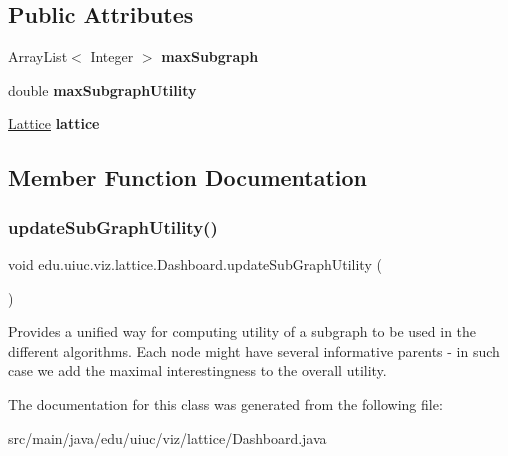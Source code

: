\subsection*{Public Attributes}
\begin{DoxyCompactItemize}
\item 
\mbox{\label{classedu_1_1uiuc_1_1viz_1_1lattice_1_1_dashboard_ad624354d237ebede6bde8751c5b37ff5}} 
Array\+List$<$ Integer $>$ {\bfseries max\+Subgraph}
\item 
\mbox{\label{classedu_1_1uiuc_1_1viz_1_1lattice_1_1_dashboard_a1078030e43f83e0e20bd6695dca9bc65}} 
double {\bfseries max\+Subgraph\+Utility}
\item 
\mbox{\label{classedu_1_1uiuc_1_1viz_1_1lattice_1_1_dashboard_a63a74fa170c8deda7b05ded929774567}} 
\mbox{\hyperlink{classedu_1_1uiuc_1_1viz_1_1lattice_1_1_lattice}{Lattice}} {\bfseries lattice}
\end{DoxyCompactItemize}


\subsection{Member Function Documentation}
\mbox{\label{classedu_1_1uiuc_1_1viz_1_1lattice_1_1_dashboard_a8df0f4fca22aceb9de4f568f6f54b85b}} 
\subsubsection{\texorpdfstring{updateSubGraphUtility()}{updateSubGraphUtility()}}
{\footnotesize\ttfamily void edu.\+uiuc.\+viz.\+lattice.\+Dashboard.\+update\+Sub\+Graph\+Utility (\begin{DoxyParamCaption}{ }\end{DoxyParamCaption})}

Provides a unified way for computing utility of a subgraph to be used in the different algorithms. Each node might have several informative parents -\/ in such case we add the maximal interestingness to the overall utility. 

The documentation for this class was generated from the following file\+:\begin{DoxyCompactItemize}
\item 
src/main/java/edu/uiuc/viz/lattice/Dashboard.\+java\end{DoxyCompactItemize}
